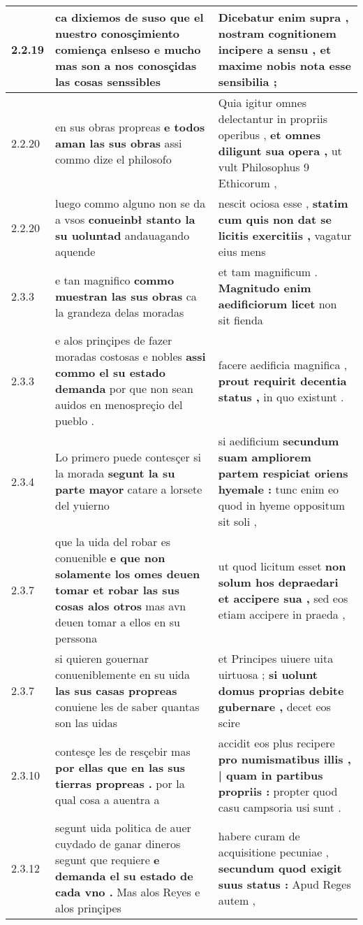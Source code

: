 \begin{tabular}{|p{1cm}|p{6.5cm}|p{6.5cm}|}
2.2.19 & ca dixiemos de suso \textbf{ que el nuestro conosçimiento comiença enlseso } e mucho mas son a nos conosçidas las cosas senssibles & Dicebatur enim supra , \textbf{ nostram cognitionem incipere a sensu , } et maxime nobis nota esse sensibilia ; \\\hline
2.2.20 & en sus obras propreas \textbf{ e todos aman las sus obras } assi commo dize el philosofo & Quia igitur omnes delectantur in propriis operibus , \textbf{ et omnes diligunt sua opera , } ut vult Philosophus 9 Ethicorum , \\\hline
2.2.20 & luego commo alguno non se da a vsos \textbf{ conueinbł stanto la su uoluntad } andauagando aquende & nescit ociosa esse , \textbf{ statim cum quis non dat se licitis exercitiis , } vagatur eius mens \\\hline
2.3.3 & e tan magnifico \textbf{ commo muestran las sus obras } ca la grandeza delas moradas & et tam magnificum . \textbf{ Magnitudo enim aedificiorum licet } non sit fienda \\\hline
2.3.3 & e alos prinçipes de fazer moradas costosas e nobles \textbf{ assi commo el su estado demanda } por que non sean auidos en menospreçio del pueblo . & facere aedificia magnifica , \textbf{ prout requirit decentia status , } in quo existunt . \\\hline
2.3.4 & Lo primero puede contesçer si la morada \textbf{ segunt la su parte mayor } catare a lorsete del yuierno & si aedificium \textbf{ secundum suam ampliorem partem respiciat oriens hyemale : } tunc enim eo quod in hyeme oppositum sit soli , \\\hline
2.3.7 & que la uida del robar es conuenible \textbf{ e que non solamente los omes deuen tomar et robar las sus cosas alos otros } mas avn deuen tomar a ellos en su perssona & ut quod licitum esset \textbf{ non solum hos depraedari et accipere sua , } sed eos etiam accipere in praeda , \\\hline
2.3.7 & si quieren gouernar conueniblemente en su uida \textbf{ las sus casas propreas } conuiene les de saber quantas son las uidas & et Principes uiuere uita uirtuosa ; \textbf{ si uolunt domus proprias debite gubernare , } decet eos scire \\\hline
2.3.10 & contesçe les de resçebir mas \textbf{ por ellas que en las sus tierras propreas . } por la qual cosa a auentra a & accidit eos plus recipere \textbf{ pro numismatibus illis , | quam in partibus propriis : } propter quod casu campsoria usi sunt . \\\hline
2.3.12 & segunt uida politica de auer cuydado de ganar dineros segunt que requiere \textbf{ e demanda el su estado de cada vno . } Mas alos Reyes e alos prinçipes & habere curam de acquisitione pecuniae , \textbf{ secundum quod exigit suus status : } Apud Reges autem , \\\hline

\end{tabular}
